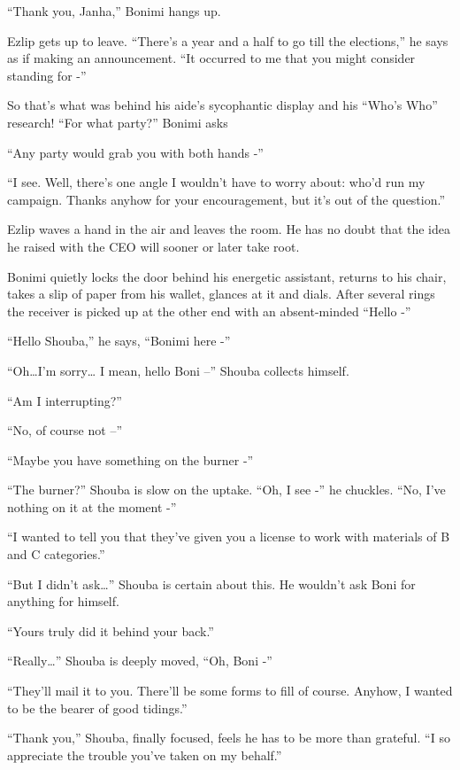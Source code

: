 \documentclass[twoside,11pt]{book}
\begin{document}
``Thank you, Janha,'' Bonimi hangs up.

Ezlip gets up to leave. ``There's a year and a half to go till the elections,'' he says as if
making an announcement. ``It occurred to me that you might consider standing for -''

So that's what was behind his aide's sycophantic display and his ``Who's
Who'' research! ``For what party?'' Bonimi asks

``Any party would grab you with both hands -''

``I see. Well, there's one angle I wouldn't have to worry about: who'd run my campaign.
Thanks anyhow for your encouragement, but it's out of the question.''

Ezlip waves a hand in the air and leaves the room. He has no doubt that the idea he raised with the CEO will sooner or
later take root.

Bonimi quietly locks the door behind his energetic assistant, returns to his chair, takes a slip of paper from his
wallet, glances at it and dials.  After several rings the receiver is picked up at the other end with an absent-minded
``Hello -''

``Hello Shouba,'' he says, ``Bonimi here -''

``Oh{\ldots}I'm sorry{\dots} I mean, hello Boni --'' Shouba collects himself.

``Am I interrupting?''

``No, of course not --''

``Maybe you have something on the burner -''

``The burner?'' Shouba is slow on the uptake.  ``Oh, I see -'' he
chuckles. ``No, I've nothing on it at the moment -''

``I wanted to tell you that they've given you a license to work with materials of B and C
categories.''

``But I didn't ask{\dots}'' Shouba is certain about this. He wouldn't ask Boni for anything
for himself.

``Yours truly did it behind your back.''

``Really{\dots}'' Shouba is deeply moved, ``Oh,  Boni -''

``They'll mail it to you. There'll be some forms to fill of course. Anyhow, I wanted to be the bearer of
good tidings.''

``Thank you,'' Shouba, finally focused, feels he has to be more than grateful.
``I so appreciate the trouble you've taken on my behalf.''
\end{document}

